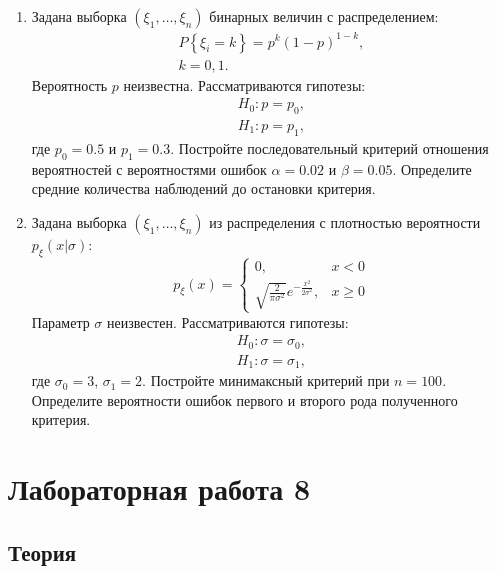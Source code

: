 \documentclass[a4paper,12pt]{article}
\newcommand{\probability}[1]{P \left\{ #1 \right\}}
\begin{document}
\begin{enumerate}
      \item Задана выборка $\left( \xi_1, \dots, \xi_n \right)$ бинарных величин с распределением:
            \begin{gather*}
                  \probability{\xi_i = k} = p^k (1-p)^{1-k}, \\
                  k = 0,1.
            \end{gather*}
            Вероятность $p$ неизвестна. Рассматриваются гипотезы:
            \begin{gather*}
                  H_0: p = p_0 , \\
                  H_1: p = p_1 ,
            \end{gather*}
            где $p_0 = 0.5$ и $p_1 = 0.3$. Постройте последовательный критерий отношения вероятностей с вероятностями ошибок $\alpha = 0.02$ и
            $\beta = 0.05$. Определите средние количества наблюдений до остановки критерия.

      \item Задана выборка $\left( \xi_1, \dots, \xi_n \right)$ из распределения с плотностью вероятности $p_\xi(x | \sigma)$:
            \[
                  p_\xi(x) = \left \{
                  \begin{array}{ll}
                        0,                                                         & x < 0   \\
                        \sqrt{\frac{2}{\pi \sigma^2}} e^{-\frac{x^2}{2 \sigma^2}}, & x \ge 0
                  \end{array}
                  \right .
            \]
            Параметр $\sigma$ неизвестен. Рассматриваются гипотезы:
            \begin{gather*}
                  H_0: \sigma = \sigma_0 , \\
                  H_1: \sigma = \sigma_1 ,
            \end{gather*}
            где $\sigma_0 = 3$, $\sigma_1 = 2$. Постройте минимаксный критерий при $n = 100$. Определите вероятности ошибок первого и второго рода
            полученного критерия.
\end{enumerate}

\section*{Лабораторная работа 8}

\subsection*{Теория}
\end{document}
